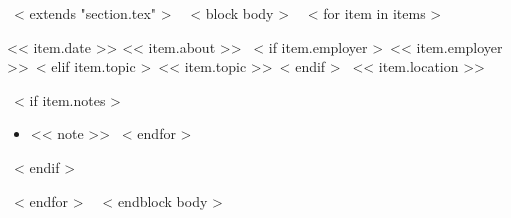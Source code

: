 ~< extends "section.tex" >~
~< block body >~
  ~< for item in items >~
    \begin{samepage}
      \cventry
        {<< item.date >>}
        {<< item.about >>}
        {~< if item.employer >~<< item.employer >>~< elif item.topic >~<< item.topic >>~< endif >~}
        {<< item.location >>}
        {}
        { %
          ~< if item.notes >~
            \begin{itemize}
              ~< for note in item.notes >~
                \item{<< note >>}
              ~< endfor >~
            \end{itemize}
          ~< endif >~
        }
    \end{samepage}
    \vspace{10pt}
  ~< endfor >~
  \vspace{-10pt}
~< endblock body >~

